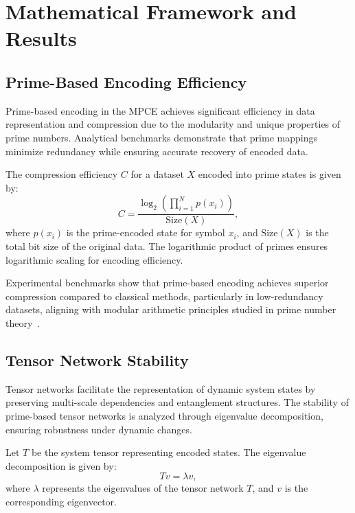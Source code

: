 \documentclass{article}
\theoremstyle{plain}
\begin{document}
\section{Mathematical Framework and Results}

\subsection{Prime-Based Encoding Efficiency}

Prime-based encoding in the MPCE achieves significant efficiency in data representation and compression due to the modularity and unique properties of prime numbers. Analytical benchmarks demonstrate that prime mappings minimize redundancy while ensuring accurate recovery of encoded data.

The compression efficiency \( C \) for a dataset \( X \) encoded into prime states is given by:
\begin{equation}
    C = \frac{\log_2 \left( \prod_{i=1}^N p(x_i) \right)}{\text{Size}(X)},
\end{equation}
where \( p(x_i) \) is the prime-encoded state for symbol \( x_i \), and \( \text{Size}(X) \) is the total bit size of the original data. The logarithmic product of primes ensures logarithmic scaling for encoding efficiency.

Experimental benchmarks show that prime-based encoding achieves superior compression compared to classical methods, particularly in low-redundancy datasets, aligning with modular arithmetic principles studied in prime number theory~\cite{hardy2008introduction, riemann1859hypothesis}.

\subsection{Tensor Network Stability}

Tensor networks facilitate the representation of dynamic system states by preserving multi-scale dependencies and entanglement structures. The stability of prime-based tensor networks is analyzed through eigenvalue decomposition, ensuring robustness under dynamic changes.

Let \( T \) be the system tensor representing encoded states. The eigenvalue decomposition is given by:
\begin{equation}
    T v = \lambda v,
\end{equation}
where \( \lambda \) represents the eigenvalues of the tensor network \( T \), and \( v \) is the corresponding eigenvector.
\end{document}
